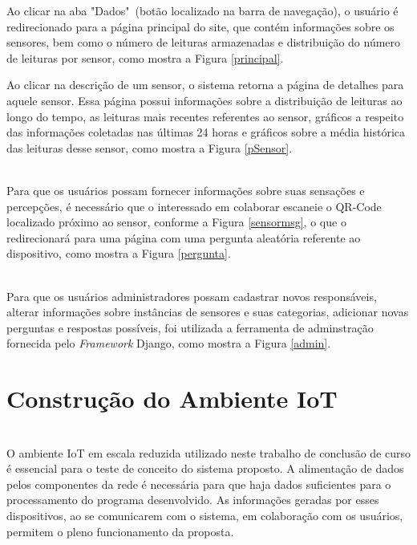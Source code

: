 \newpage
\null \quad Ao clicar na aba "Dados"\ (botão localizado na barra de navegação), o usuário é redirecionado para a página principal do site, que contém informações sobre os sensores, bem como o número de leituras armazenadas e distribuição do número de leituras por sensor, como mostra a Figura \ref{principal}.

\newpage
\null \quad Ao clicar na descrição de um sensor, o sistema retorna a página de detalhes para aquele sensor. Essa página possui informações sobre a distribuição de leituras ao longo do tempo, as leituras mais recentes referentes ao sensor, gráficos a respeito das informações coletadas nas últimas 24 horas e gráficos sobre a média histórica das leituras desse sensor, como mostra a Figura \ref{pSensor}.
\newpage
{}


\\\null \quad Para que os usuários possam fornecer informações sobre suas sensações e percepções, é necessário que o interessado em colaborar escaneie o QR-Code localizado próximo ao sensor, conforme a Figura \ref{sensormsg}, o que o redirecionará para uma página com uma pergunta aleatória referente ao dispositivo, como mostra a Figura \ref{pergunta}.


\\\null \quad Para que os usuários administradores possam cadastrar novos responsáveis, alterar informações sobre instâncias de sensores e suas categorias, adicionar novas perguntas e respostas possíveis, foi utilizada a ferramenta de adminstração fornecida pelo \textit{Framework} Django, como mostra a Figura \ref{admin}.



\section{Construção do Ambiente IoT}
\label{sec:ambiente}
\\\null \quad O ambiente \acrshort{IoT} em escala reduzida utilizado neste trabalho de conclusão de curso é essencial para o teste de conceito
do sistema proposto. A alimentação de dados pelos componentes da rede é necessária para que haja
dados suficientes para o processamento do programa desenvolvido. As informações geradas por esses dispositivos, ao se comunicarem com o sistema, em colaboração
com os usuários, permitem o pleno funcionamento da proposta.

